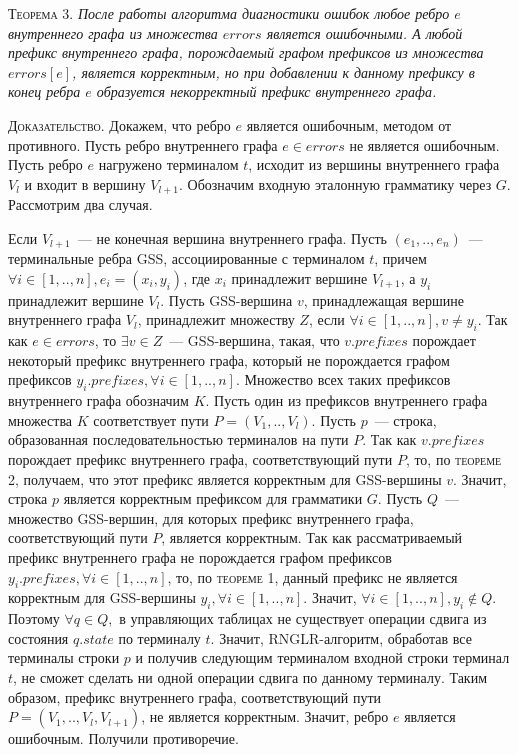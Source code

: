 \textsc{Теорема 3.}
\textit{После работы алгоритма диагностики ошибок любое ребро $e$ внутреннего графа из множества $errors$ является ошибочными. А любой префикс внутреннего графа, порождаемый графом префиксов из множества $errors[e]$, является корректным, но при добавлении к данному префиксу в конец ребра $e$ образуется некорректный префикс внутреннего графа.}

\textsc{Доказательство.}
Докажем, что ребро $e$ является ошибочным, методом от противного. Пусть ребро внутреннего графа $e \in errors$ не является ошибочным. Пусть ребро $e$ нагружено терминалом $t$, исходит из вершины внутреннего графа $V_{l}$ и входит в вершину $V_{l+1}$. Обозначим входную эталонную грамматику через $G$. Рассмотрим два случая.

Если $V_{l+1}$~--- не конечная вершина внутреннего графа. Пусть $(e_{1},..,e_{n})$~--- терминальные ребра GSS, ассоциированные с терминалом $t$, причем $\forall i \in [1,..,n], e_{i} = (x_{i},y_{i})$, где $x_{i}$ принадлежит вершине $V_{l+1}$, а $y_{i}$ принадлежит вершине $V_{l}$. Пусть GSS-вершина $v$, принадлежащая вершине внутреннего графа $V_{l}$, принадлежит множеству $Z$, если $\forall i \in [1,..,n], v \neq y_{i}$. Так как $e \in errors$, то $\exists v \in Z$~--- GSS-вершина, такая, что $v.prefixes$ порождает некоторый префикс внутреннего графа, который не порождается графом префиксов $y_{i}.prefixes, \forall i \in [1,..,n]$. Множество всех таких префиксов внутреннего графа обозначим $K$. Пусть один из префиксов внутреннего графа множества $K$ соответствует пути $P = (V_{1},..,V_{l})$. Пусть $p$~--- строка, образованная последовательностью терминалов на пути $P$. Так как $v.prefixes$ порождает префикс внутреннего графа, соответствующий пути $P$, то, по \textsc{теореме 2}, получаем, что этот префикс является корректным для GSS-вершины $v$. Значит, строка $p$ является корректным префиксом для грамматики $G$. Пусть $Q$~--- множество GSS-вершин, для которых префикс внутреннего графа, соответствующий пути $P$, является корректным. Так как рассматриваемый префикс внутреннего графа не порождается графом префиксов $y_{i}.prefixes, \forall i \in [1,..,n]$, то, по \textsc{теореме 1}, данный префикс не является корректным для GSS-вершины $y_{i}, \forall i \in [1,..,n]$. Значит, $\forall i \in [1,..,n], y_{i} \notin Q$. Поэтому $\forall q \in Q,$ в управляющих таблицах не существует операции сдвига из состояния $q.state$ по терминалу $t$. Значит, RNGLR-алгоритм, обработав все терминалы строки $p$ и получив следующим терминалом входной строки терминал $t$, не сможет сделать ни одной операции сдвига по данному терминалу. Таким образом, префикс внутреннего графа, соответствующий пути $P = (V_{1},..,V_{l},V_{l+1})$, не является корректным. Значит, ребро $e$ является ошибочным. Получили противоречие.

